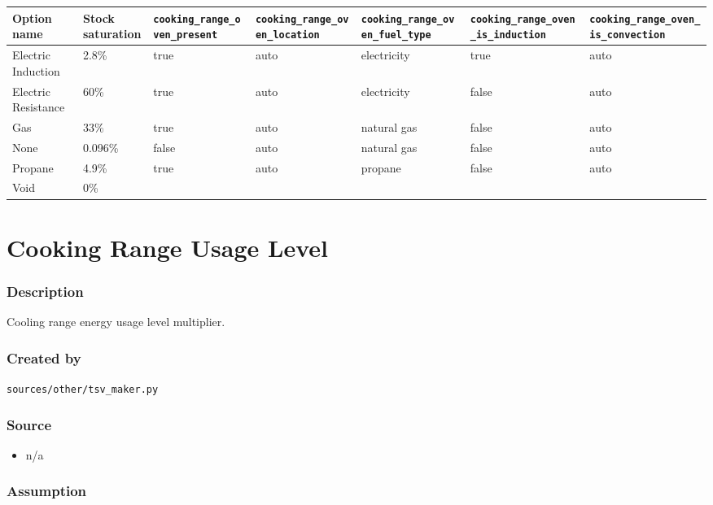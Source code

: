 \begin{longtable}[]{@{}lllllll@{}}
\toprule\noalign{}
Option name & Stock saturation & \texttt{cooking\_range\_oven\_present}
& \texttt{cooking\_range\_oven\_location} &
\texttt{cooking\_range\_oven\_fuel\_type} &
\texttt{cooking\_range\_oven\_is\_induction} &
\texttt{cooking\_range\_oven\_is\_convection} \\
\midrule\noalign{}
\endhead
\bottomrule\noalign{}
\endlastfoot
Electric Induction & 2.8\% & true & auto & electricity & true & auto \\
Electric Resistance & 60\% & true & auto & electricity & false & auto \\
Gas & 33\% & true & auto & natural gas & false & auto \\
None & 0.096\% & false & auto & natural gas & false & auto \\
Propane & 4.9\% & true & auto & propane & false & auto \\
Void & 0\% & & & & & \\
\end{longtable}

\section{Cooking Range Usage Level}\label{cooking_range_usage_level}

\subsubsection{Description}\label{description-21}

Cooling range energy usage level multiplier.

\subsubsection{Created by}\label{created-by-21}

\texttt{sources/other/tsv\_maker.py}

\subsubsection{Source}\label{source-21}

\begin{itemize}
 
\item
  n/a
\end{itemize}

\subsubsection{Assumption}\label{assumption-12}

